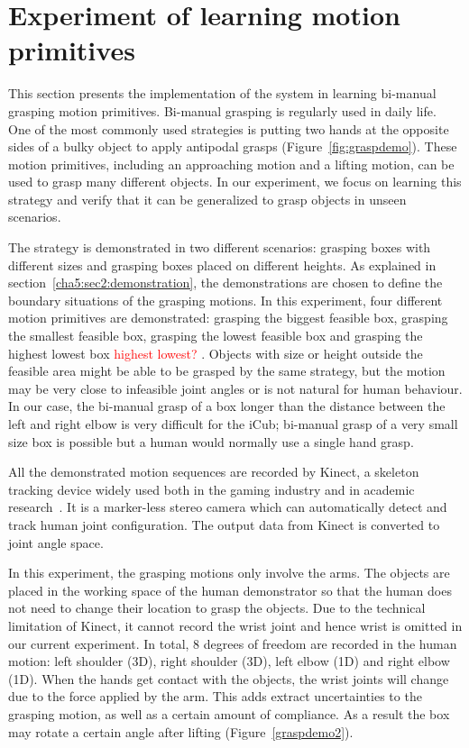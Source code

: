 \section{Experiment of learning motion primitives}
\label{cha5:sec3}




This section presents the implementation of the system in learning bi-manual grasping motion primitives. Bi-manual grasping is regularly used in daily life. One of the most commonly used strategies is putting two hands at the opposite sides of a bulky object to apply antipodal grasps (Figure~\ref{fig:graspdemo}). These motion primitives, including an approaching motion and a lifting motion, can be used to grasp many different objects. In our experiment, we focus on learning this strategy and verify that it can be generalized to grasp objects in unseen scenarios.

The strategy is demonstrated in two different scenarios: grasping boxes with different sizes and grasping boxes placed on different heights. As explained in section~\ref{cha5:sec2:demonstration}, the demonstrations are chosen to define the boundary situations of the grasping motions. In this experiment, four different motion primitives are demonstrated: grasping the biggest feasible box,  grasping the smallest feasible box, grasping the lowest feasible box and grasping the highest lowest box \textcolor{red}{highest lowest? }. Objects with size or height outside the feasible area might be able to be grasped by the same strategy, but the motion may be very close to infeasible joint angles or is not natural for human behaviour. In our case, the bi-manual grasp of a box longer than the distance between the left and right elbow is very difficult for the iCub; bi-manual grasp of a very small size box is possible but a human would normally use a single hand grasp.

All the demonstrated motion sequences are recorded by Kinect, a skeleton tracking device widely used both in the gaming industry and in academic research~\citep{ren20123d}. It is a marker-less stereo camera which can automatically detect and track human joint configuration. The output data from Kinect is converted to joint angle space.

In this experiment, the grasping motions only involve the arms. The objects are placed in the working space of the human demonstrator so that the human does not need to change their location to grasp the objects. Due to the technical limitation of Kinect, it cannot record the wrist joint and hence wrist is omitted in our current experiment. In total, 8 degrees of freedom are recorded in the human motion: left shoulder (3D), right shoulder (3D), left elbow (1D) and right elbow (1D). When the hands get contact with the objects, the wrist joints will change due to the force applied by the arm. This adds extract uncertainties to the grasping motion, as well as a certain amount of compliance. As a result the box may rotate a certain angle after lifting (Figure~\ref{graspdemo2}).


